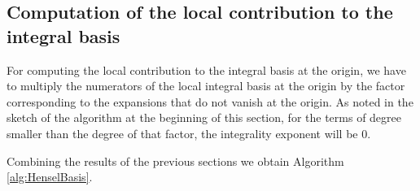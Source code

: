 \documentclass[a4paper,11pt]{amsart}%
\theoremstyle{definition}
\theoremstyle{plain}
\theoremstyle{remark}
\begin{document}
\subsection{Computation of the local contribution to the integral basis}

For computing the local contribution to the integral basis at the origin, we
have to multiply the numerators of the local integral basis at the origin by
the factor corresponding to the expansions that do not vanish at the origin.
As noted in the sketch of the algorithm at the beginning of this section, for
the terms of degree smaller than the degree of that factor, the integrality
exponent will be $0$.

Combining the results of the previous sections we obtain Algorithm
\ref{alg:HenselBasis}.











\end{document}
